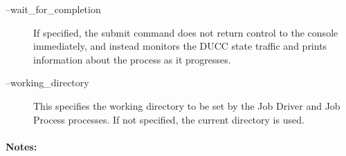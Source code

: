 \begin{description}
        \item[--wait\_for\_completion ] If specified, the submit command does not return control to
          the console immediately, and instead monitors the DUCC state traffic and prints
          information about the process as it progresses.
          
        \item[--working\_directory ] This specifies the working directory to be set by the Job
          Driver and Job Process processes.  If not specified, the current directory is used.

     \end{description}
        
    \paragraph{Notes:}

